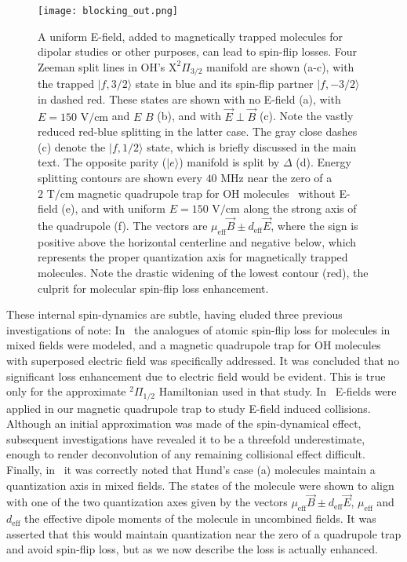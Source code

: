 \documentclass[%
 reprint,
 amsmath,amssymb,
 aps,
prl,
]{revtex4-1}
\newcommand{\epb}{{$\vec{E}\!\perp\!\vec{B}$}}
\begin{document}
\begin{figure}[tb]
\texttt{[image: blocking\_out.png]}%
\caption{
A uniform E-field, added to magnetically trapped molecules for dipolar studies or other purposes, can lead to spin-flip losses. 
Four Zeeman split lines in OH's $\mathrm{X}^2\Pi_{3/2}$ manifold are shown (a-c), with the trapped $|f,3/2\rangle$ state in blue and its spin-flip partner $|f,-3/2\rangle$ in dashed red. 
These states are shown with no E-field (a), with $E=150\text{ V/cm}$ and $E\,$\raisebox{0.5px}{$\parallel$}$\,B$ (b), and with \epb{} (c). 
Note the vastly reduced red-blue splitting in the latter case. 
The gray close dashes (c) denote the $|f,1/2\rangle$ state, which is briefly discussed in the main text.
The opposite parity ($|e\rangle$) manifold is split by $\Delta$ (d). 
Energy splitting contours are shown every $40\text{ MHz}$ near the zero of a $2\text{ T/cm}$ magnetic quadrupole trap for OH molecules~\cite{Stuhl2012uwave} without E-field (e), and with uniform $E=150\text{ V/cm}$ along the strong axis of the quadrupole (f). 
The vectors are $\mu_\text{eff}\vec{B}\pm d_\text{eff}\vec{E}$, where the sign is positive above the horizontal centerline and negative below, which  represents the proper quantization axis for magnetically trapped molecules. 
Note the drastic widening of the lowest contour (red), the culprit for molecular spin-flip loss enhancement.
}
\label{fig:blocking}
\end{figure}

These internal spin-dynamics are subtle, having eluded three previous investigations of note: In~\cite{Lara2008} the analogues of atomic spin-flip loss for molecules in mixed fields were modeled, and a magnetic quadrupole trap for OH molecules with superposed electric field was specifically addressed. 
It was concluded that no significant loss enhancement due to electric field would be evident. 
This is true only for the approximate $^2\Pi_{1/2}$ Hamiltonian used in that study. 
In~\cite{Stuhl2013} E-fields were applied in our magnetic quadrupole trap to study E-field induced collisions. 
Although an initial approximation was made of the spin-dynamical effect, subsequent investigations have revealed it to be a threefold underestimate, enough to render deconvolution of any remaining collisional effect difficult. 
Finally, in~\cite{Bohn2013} it was correctly noted that Hund's case (a) molecules maintain a quantization axis in mixed fields. 
The states of the molecule were shown to align with one of the two quantization axes given by the vectors $\mu_\text{eff}\vec{B}\pm d_\text{eff}\vec{E}$, $\mu_\text{eff}$ and $d_\text{eff}$ the effective dipole moments of the molecule in uncombined fields. 
It was asserted that this would maintain quantization near the zero of a quadrupole trap and avoid spin-flip loss, but as we now describe the loss is actually enhanced.
\end{document}
